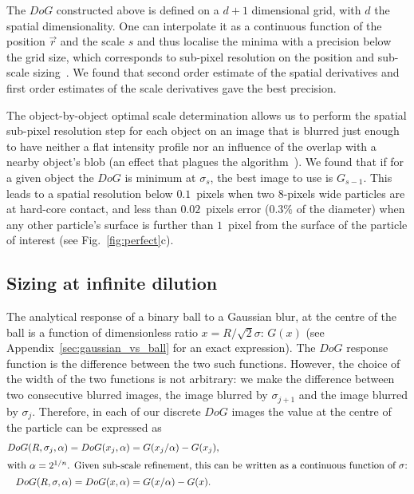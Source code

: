 \documentclass[8.5pt,twoside,twocolumn]{article}
\begin{document}
The $DoG$ constructed above is defined on a $d+1$ dimensional grid, with $d$ the spatial dimensionality. One can interpolate it as a continuous function of the position $\vec{r}$ and the scale $s$ and thus localise the minima with a precision below the grid size, which corresponds to sub-pixel resolution on the position and sub-scale sizing~\citep{Lowe2004}. We found that second order estimate of the spatial derivatives and first order estimates of the scale derivatives gave the best precision.

The object-by-object optimal scale determination allows us to perform the spatial sub-pixel resolution step for each object on an image that is blurred just enough to have neither a flat intensity profile nor an influence of the overlap with a nearby object's blob (an effect that plagues the \citet{Crocker1996} algorithm~\cite{Jenkins2008}). We found that if for a given object the $DoG$ is minimum at $\sigma_s$, the best image to use is $G_{s-1}$. This leads to a spatial resolution below $0.1$~pixels when two $8$-pixels wide particles are at hard-core contact, and less than $0.02$~pixels error ($0.3\%$ of the diameter) when any other particle's surface is further than $1$~pixel from the surface of the particle of interest (see Fig.~\ref{fig:perfect}c).

\subsection{Sizing at infinite dilution}
\label{sec:dilute}
The analytical response of a binary ball to a Gaussian blur, at the centre of the ball is a function of dimensionless ratio $x=R/\sqrt{2}\sigma$: $G(x)$ (see Appendix~\ref{sec:gaussian_vs_ball} for an exact expression). The $DoG$ response function is the difference between the two such functions. However, the choice of the width of the two functions is not arbitrary: we make the difference between two consecutive blurred images, the image blurred by $\sigma_{j+1}$ and the image blurred by $\sigma_j$. Therefore, in each of our discrete $DoG$ images the value at the centre of the particle can be expressed as
\begin{align}
DoG(R,\sigma_j, \alpha) = DoG(x_j, \alpha) &= G(x_j/\alpha) - G(x_j),\\
\intertext{with $\alpha=2^{1/n}$. Given sub-scale refinement, this can be written as a continuous function of $\sigma$:}
DoG(R,\sigma, \alpha) = DoG(x, \alpha) &= G(x/\alpha) - G(x).
\end{align}
\end{document}
